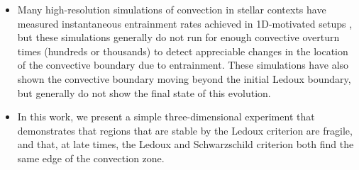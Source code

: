 \begin{itemize}
    \item Many high-resolution simulations of convection in stellar contexts have measured instantaneous entrainment rates achieved in 1D-motivated setups \citep{meakin_arnett_2007, woodward_etal_2015, jones_etal_2017, cristini_etal_2019, andrassy_etal_2020}, but these simulations generally do not run for enough convective overturn times (hundreds or thousands) to detect appreciable changes in the location of the convective boundary due to entrainment.
        These simulations have also shown the convective boundary moving beyond the initial Ledoux boundary, but generally do not show the final state of this evolution.
    \item In this work, we present a simple three-dimensional experiment that demonstrates that regions that are stable by the Ledoux criterion are fragile, and that, at late times, the Ledoux and Schwarzschild criterion both find the same edge of the convection zone.
\end{itemize}

